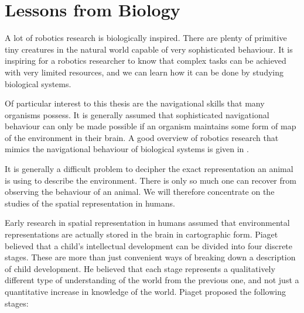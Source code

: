 
\section{Lessons from Biology}

A lot of robotics research is biologically inspired. There are plenty
of primitive tiny creatures in the natural world capable of
very sophisticated behaviour. It is inspiring for a robotics
researcher to know that complex tasks can be achieved with very
limited resources, and we can learn how it can be done by studying
biological systems.

Of particular interest to this thesis are the navigational skills that
many organisms possess. It is generally assumed that sophisticated
navigational behaviour can only be made possible if an organism
maintains some form of map of the environment in their brain.  A good
overview of robotics research that mimics the navigational behaviour of
biological systems is given in \cite{bio_franz00}.

It is generally a difficult problem to decipher the exact
representation an animal is using to describe the environment. There
is only so much one can recover from observing the behaviour of an
animal. We will therefore concentrate on the studies of the spatial
representation in humans.

Early research in spatial representation in humans
\cite{psycho_piaget56} assumed that environmental representations are
actually stored in the brain in cartographic form.  Piaget believed
that a child's intellectual development can be divided into four
discrete stages. These are more than just convenient ways of breaking
down a description of child development. He believed that each stage
represents a qualitatively different type of understanding of the
world from the previous one, and not just a quantitative increase in
knowledge of the world. Piaget proposed the following stages:

